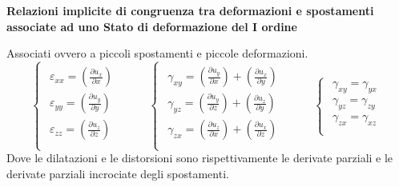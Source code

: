 \documentclass{article}
\begin{document}
\begin{adjustwidth}{2in}{}
	\begin{center}
		\textbf{Relazioni implicite di congruenza tra deformazioni e spostamenti associate ad uno Stato di deformazione del I ordine} \newline
	\end{center}
	
	Associati ovvero a piccoli spostamenti e piccole deformazioni.
	\[
	\begin{cases}
		\begin{aligned}
			\varepsilon_{xx} =  \left( \frac{\partial u_x}{\partial x}\right) \\
			\varepsilon_{yy} =  \left( \frac{\partial u_y}{\partial y}\right) \\
			\varepsilon_{zz} =  \left( \frac{\partial u_z}{\partial z}\right) \\
		\end{aligned}
	\end{cases} \hspace{1cm} \begin{cases}
		\begin{aligned}
			\gamma_{xy} =   \left( \frac{\partial u_y}{\partial x}\right) + \left( \frac{\partial u_x}{\partial y}\right) \\
			\gamma_{yz} =   \left( \frac{\partial u_y}{\partial z}\right) + \left( \frac{\partial u_z}{\partial y}\right) \\
			\gamma_{zx} =   \left( \frac{\partial u_z}{\partial x}\right) + \left( \frac{\partial u_x}{\partial z}\right) \\
		\end{aligned}
	\end{cases} \hspace{1cm} \begin{cases}
	\begin{aligned}
		\gamma_{xy} =   \gamma_{yx} \\
		\gamma_{yz} =   \gamma_{zy} \\
		\gamma_{zx} =   \gamma_{xz} \\
	\end{aligned}
	\end{cases}
	\]
	Dove le dilatazioni e le distorsioni sono rispettivamente le derivate parziali e le derivate parziali incrociate degli spostamenti. \newline 
	

\end{adjustwidth}
\end{document}
